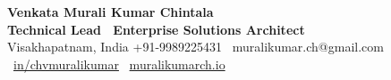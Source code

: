 \documentclass[10pt,a4paper]{article}
\begin{document}
\begin{center}
    {\huge\bfseries\color{headerblue} Venkata Murali Kumar Chintala} \\[3pt]
    {\normalsize\textbf{\color{textgray} Technical Lead \textbar\ Enterprise Solutions Architect}} \\[6pt]
    \footnotesize
    \faMapMarker* Visakhapatnam, India \quad \textbar \quad
    \faPhone* +91-9989225431 \quad \textbar \quad
    \faEnvelope \ muralikumar.ch@gmail.com \quad \textbar \quad
    \faLinkedin \ \href{https://linkedin.com/in/chvmuralikumar}{in/chvmuralikumar} \quad \textbar \quad
    \faGlobe \ \href{https://muralikumarch.github.io/java-portfolio/}{muralikumarch.io}
\end{center}

\vspace{2pt}
\end{document}
